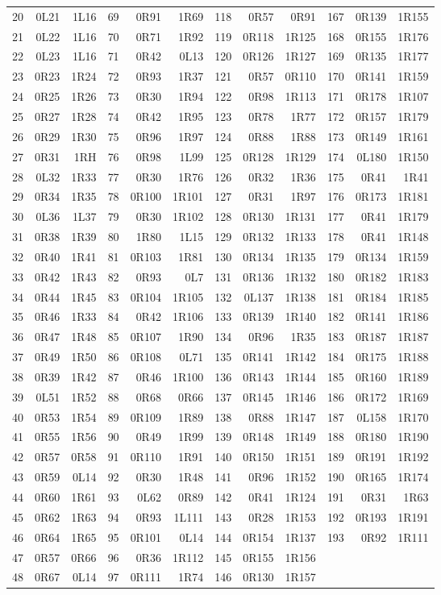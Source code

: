 \begin{center}
\begin{tabular}{rrr@{\hspace{13pt}}rrr@{\hspace{13pt}}rrr@{\hspace{13pt}}rrr}
20&0L21&1L16&69&0R91&1R69&118&0R57&0R91&167&0R139&1R155\\
21&0L22&1L16&70&0R71&1R92&119&0R118&1R125&168&0R155&1R176\\
22&0L23&1L16&71&0R42&0L13&120&0R126&1R127&169&0R135&1R177\\
23&0R23&1R24&72&0R93&1R37&121&0R57&0R110&170&0R141&1R159\\
24&0R25&1R26&73&0R30&1R94&122&0R98&1R113&171&0R178&1R107\\
25&0R27&1R28&74&0R42&1R95&123&0R78&1R77&172&0R157&1R179\\
26&0R29&1R30&75&0R96&1R97&124&0R88&1R88&173&0R149&1R161\\
27&0R31&1RH&76&0R98&1L99&125&0R128&1R129&174&0L180&1R150\\
28&0L32&1R33&77&0R30&1R76&126&0R32&1R36&175&0R41&1R41\\
29&0R34&1R35&78&0R100&1R101&127&0R31&1R97&176&0R173&1R181\\
30&0L36&1L37&79&0R30&1R102&128&0R130&1R131&177&0R41&1R179\\
31&0R38&1R39&80&1R80&1L15&129&0R132&1R133&178&0R41&1R148\\
32&0R40&1R41&81&0R103&1R81&130&0R134&1R135&179&0R134&1R159\\
33&0R42&1R43&82&0R93&0L7&131&0R136&1R132&180&0R182&1R183\\
34&0R44&1R45&83&0R104&1R105&132&0L137&1R138&181&0R184&1R185\\
35&0R46&1R33&84&0R42&1R106&133&0R139&1R140&182&0R141&1R186\\
36&0R47&1R48&85&0R107&1R90&134&0R96&1R35&183&0R187&1R187\\
37&0R49&1R50&86&0R108&0L71&135&0R141&1R142&184&0R175&1R188\\
38&0R39&1R42&87&0R46&1R100&136&0R143&1R144&185&0R160&1R189\\
39&0L51&1R52&88&0R68&0R66&137&0R145&1R146&186&0R172&1R169\\
40&0R53&1R54&89&0R109&1R89&138&0R88&1R147&187&0L158&1R170\\
41&0R55&1R56&90&0R49&1R99&139&0R148&1R149&188&0R180&1R190\\
42&0R57&0R58&91&0R110&1R91&140&0R150&1R151&189&0R191&1R192\\
43&0R59&0L14&92&0R30&1R48&141&0R96&1R152&190&0R165&1R174\\
44&0R60&1R61&93&0L62&0R89&142&0R41&1R124&191&0R31&1R63\\
45&0R62&1R63&94&0R93&1L111&143&0R28&1R153&192&0R193&1R191\\
46&0R64&1R65&95&0R101&0L14&144&0R154&1R137&193&0R92&1R111\\
47&0R57&0R66&96&0R36&1R112&145&0R155&1R156&&&\\
48&0R67&0L14&97&0R111&1R74&146&0R130&1R157&&&\\
\bottomrule\end{tabular}\end{center}\endgroup
\clearpage
